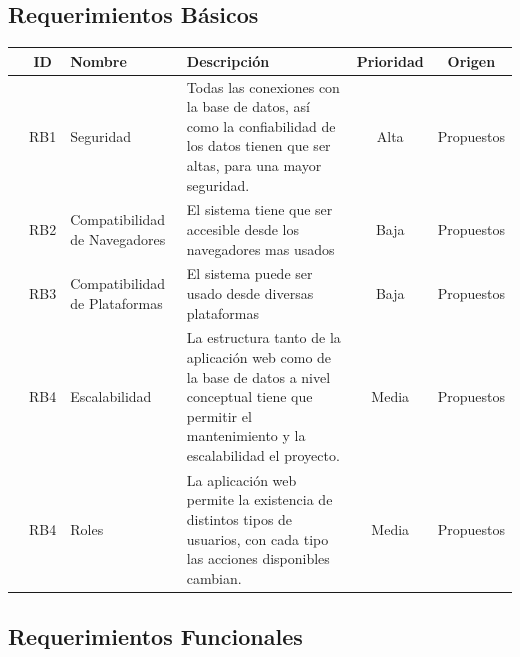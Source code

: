 \documentclass[12pt, fleqn]{report}                             %
\begin{document}
        \clearpage
        \subsection{Requerimientos Básicos}

            \begin{tabular}{r ||c |m{7em} | m{15em} |c |c }
               &  ID & Nombre & Descripción & Prioridad & Origen \\ [0.5ex] 
               \hline\hline
              
                & RB1   & Seguridad                         &
                Todas las conexiones con la base de datos, así como la confiabilidad de los datos
                tienen que ser altas, para una mayor seguridad.
                & Alta  & Propuestos\\

                & RB2   & Compatibilidad de Navegadores     &
                El sistema tiene que ser accesible desde los navegadores mas usados
                & Baja  & Propuestos\\

                & RB3   & Compatibilidad de Plataformas     &
                El sistema puede ser usado desde diversas plataformas
                & Baja  & Propuestos\\

                & RB4   & Escalabilidad                     &
                La estructura tanto de la aplicación web como de la base de datos a nivel conceptual tiene
                que permitir el mantenimiento y la escalabilidad el proyecto.
                & Media  & Propuestos\\

                & RB4   & Roles                             &
                La aplicación web permite la existencia de distintos tipos de usuarios, con cada tipo
                las acciones disponibles cambian.
                & Media  & Propuestos\\

            \end{tabular}


        \subsection{Requerimientos Funcionales}
\end{document}
